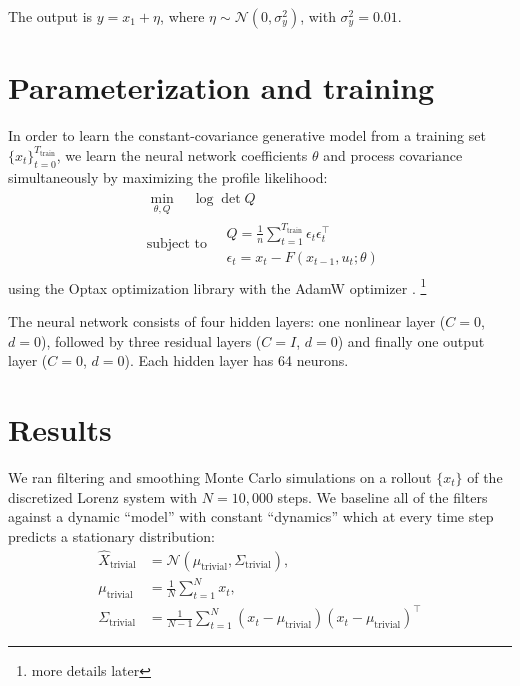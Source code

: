 \documentclass[oneside, article]{memoir}
\begin{document}
The output is \(y = x_1 + \eta\), where \(\eta \sim \mathcal N(0, \sigma_y^2)\), with \(\sigma_y^2 = 0.01\).

\section{Parameterization and training}
In order to learn the constant-covariance generative model from a
training set \(\{x_t\}_{t =0}^{T_\text{train}}\),
we learn the neural network coefficients \(\theta\) and process
covariance simultaneously by maximizing the profile likelihood:
\begin{align}
  \begin{split}
    &\min_{\theta, Q}
    \quad
    \log \det Q
    \\
    &\text{subject to}
    \quad
    \begin{matrix}
      Q = \frac{1}{n} \sum_{t = 1}^{T_\text{train}} \epsilon_t
      \epsilon_t^\intercal\\
      \epsilon_t = x_t - F(x_{t-1}, u_t; \theta)
    \end{matrix}
  \end{split}
\end{align}
using the Optax optimization library \cite{deepmind_deepmind_2020}
with the AdamW optimizer \cite{loshchilov_decoupled_2019}.
\footnote{more details later}

The neural network consists of four hidden layers: one nonlinear layer (\(C = 0\), \(d = 0\)), followed by three residual layers (\(C = I\), \(d = 0\)) and finally one output layer (\(C = 0\), \(d = 0\)).
Each hidden layer has 64 neurons.

\section{Results}
We ran filtering and smoothing Monte Carlo simulations on a rollout \(\{x_t\}\) of the discretized Lorenz system with \(N = 10,000\) steps.
We baseline all of the filters against a dynamic ``model'' with constant ``dynamics'' which at every time step predicts a stationary distribution:
\begin{align}
  \hat X_\text{trivial} &= \mathcal N (\mu_\text{trivial}, \Sigma_\text{trivial}),\\
  \mu_\text{trivial} &= \frac{1}{N} \sum_{t = 1}^N x_t,\\
  \Sigma_\text{trivial} &= \frac{1}{N-1} \sum_{t = 1}^N (x_t - \mu_\text{trivial})(x_t - \mu_\text{trivial})^\intercal
\end{align}
\end{document}
